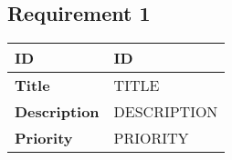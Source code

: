 \subsection{Requirement 1}
\begin{table}[H]
    \begin{tabularx}{\textwidth}{|l|l|}
        \textbf{ID} & ID \\ \hline
        \textbf{Title} & TITLE \\ \hline
        \textbf{Description} & DESCRIPTION \\ \hline
        \textbf{Priority} & PRIORITY \\\hline
    \end{tabularx}
\end{table}
